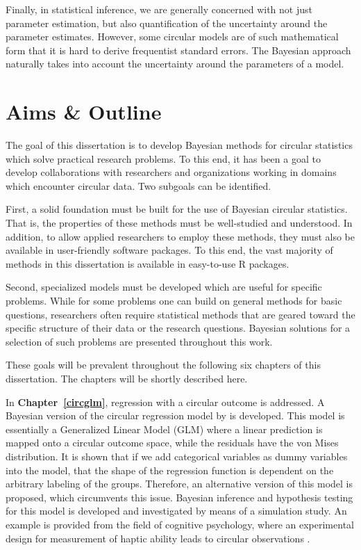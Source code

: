 \documentclass[12pt, a4paper]{book}\usepackage[]{graphicx}\usepackage{xcolor}
\let\proglang=\textsf
\begin{document}
Finally, in statistical inference, we are generally concerned with not just parameter estimation, but also quantification of the uncertainty around the parameter estimates. However, some circular models are of such mathematical form that it is hard to derive frequentist standard errors. The Bayesian approach naturally takes into account the uncertainty around the parameters of a model.

\section*{Aims \& Outline}

The goal of this dissertation is to develop Bayesian methods for circular statistics which solve practical research problems. To this end, it has been a goal to develop collaborations with researchers and organizations working in domains which encounter circular data. Two subgoals can be identified.

First, a solid foundation must be built for the use of Bayesian circular statistics. That is, the properties of these methods must be well-studied and understood. In addition, to allow applied researchers to employ these methods, they must also be available in user-friendly software packages. To this end, the vast majority of methods in this dissertation is available in easy-to-use \proglang{R} packages.

Second, specialized models must be developed which are useful for specific problems. While for some problems one can build on general methods for basic questions, researchers often require statistical methods that are geared toward the specific structure of their data or the research questions. Bayesian solutions for a selection of such problems are presented throughout this work.

These goals will be prevalent throughout the following six chapters of this dissertation. The chapters will be shortly described here.

In \textbf{Chapter~\ref{circglm}}, regression with a circular outcome is addressed. A Bayesian version of the circular regression model by \citet{fisher1992regression} is developed. This model is essentially a Generalized Linear Model (GLM) where a linear prediction is mapped onto a circular outcome space, while the residuals have the von Mises distribution. It is shown that if we add categorical variables as dummy variables into the model, that the shape of the regression function is dependent on the arbitrary labeling of the groups.
Therefore, an alternative version of this model is proposed, which circumvents this issue. Bayesian inference and hypothesis testing for this model is developed and investigated by means of a simulation study. An example is provided from the field of cognitive psychology, where an experimental design for measurement of haptic ability leads to circular observations \citep{van2013superior}.
\end{document}
